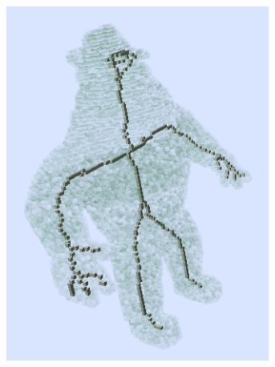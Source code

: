 \begin{figure}[!htb]
\begin{subfigure}{0.333\textwidth}
    \includegraphics[width=0.95\textwidth]{Figures/chapter-image/dgtal/voxelComplexAl1IsthtmusP0.png}%
    \caption{}
    \label{subfig:thin_al_p0}
  \end{subfigure}%
  \begin{subfigure}{0.333\textwidth}
    \centering

\end{subfigure}
\end{figure}
